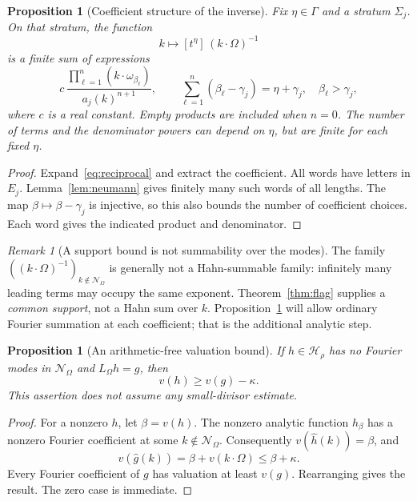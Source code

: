 \documentclass[11pt,letterpaper]{article}
\newtheorem{proposition}[theorem]{Proposition}
\theoremstyle{definition}
\theoremstyle{remark}
\newtheorem{remark}[theorem]{Remark}
\newcommand{\HH}{\mathcal H}
\newcommand{\Lom}{L_{\Omega}}
\newcommand{\res}{\mathcal N_{\Omega}}
\newcommand{\coef}[2]{[t^{#1}]\,#2}
\numberwithin{equation}{section}
\begin{document}
\begin{proposition}[Coefficient structure of the inverse]\label{prop:coeff-inverse}
Fix $\eta\in\Gamma$ and a stratum $\Sigma_j$.  On that stratum, the function
\[
 k\longmapsto \coef{\eta}{(k\cdot\Omega)^{-1}}
\]
is a finite sum of expressions
\begin{equation}\label{eq:mult-form}
 c\,\frac{\prod_{\ell=1}^n(k\cdot\omega_{\beta_\ell})}
                {a_j(k)^{n+1}},
 \qquad
 \sum_{\ell=1}^n(\beta_\ell-\gamma_j)=\eta+\gamma_j,
 \quad\beta_\ell>\gamma_j,
\end{equation}
where $c$ is a real constant.  Empty products are included when $n=0$.
The number of terms and the denominator powers can depend on $\eta$, but
are finite for each fixed $\eta$.
\end{proposition}
\begin{proof}
Expand~\eqref{eq:reciprocal} and extract the coefficient.  All words have
letters in $E_j$.  Lemma~\ref{lem:neumann} gives finitely many such words of
all lengths.  The map $\beta\mapsto\beta-\gamma_j$ is injective, so this
also bounds the number of coefficient choices.  Each word gives the indicated
product and denominator.
\end{proof}

\begin{remark}[A support bound is not summability over the modes]
The family $((k\cdot\Omega)^{-1})_{k\notin\res}$ is generally not a
Hahn-summable family: infinitely many leading terms may occupy the same
exponent.  Theorem~\ref{thm:flag} supplies a \emph{common support}, not a Hahn
sum over $k$.  Proposition~\ref{prop:coeff-inverse} will allow ordinary Fourier
summation at each coefficient; that is the additional analytic step.
\end{remark}

\begin{proposition}[An arithmetic-free valuation bound]\label{prop:val-bound}
If $h\in\HH_\rho$ has no Fourier modes in $\res$ and $\Lom h=g$, then
\[
 v(h)\ge v(g)-\kappa.
\]
This assertion does not assume any small-divisor estimate.
\end{proposition}
\begin{proof}
For a nonzero $h$, let $\beta=v(h)$.  The nonzero analytic function
$h_\beta$ has a nonzero Fourier coefficient at some $k\notin\res$.
Consequently $v(\widehat h(k))=\beta$, and
\[
 v(\widehat g(k))=\beta+v(k\cdot\Omega)\le\beta+\kappa.
\]
Every Fourier coefficient of $g$ has valuation at least $v(g)$.
Rearranging gives the result.  The zero case is immediate.
\end{proof}
\end{document}
